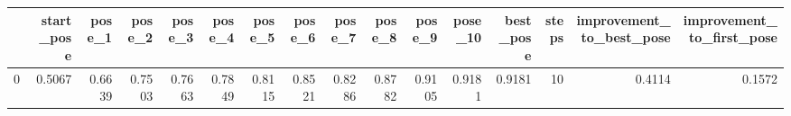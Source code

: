 \begin{tabular}{lrrrrrrrrrrrrrrr}
\toprule
{} &  start\_pose &  pose\_1 &  pose\_2 &  pose\_3 &  pose\_4 &  pose\_5 &  pose\_6 &  pose\_7 &  pose\_8 &  pose\_9 &  pose\_10 &  best\_pose &  steps &  improvement\_to\_best\_pose &  improvement\_to\_first\_pose \\
\midrule
0 &      0.5067 &  0.6639 &  0.7503 &  0.7663 &  0.7849 &  0.8115 &  0.8521 &  0.8286 &  0.8782 &  0.9105 &   0.9181 &     0.9181 &     10 &                    0.4114 &                     0.1572 \\
\bottomrule
\end{tabular}

